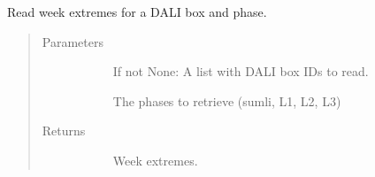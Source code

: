 \documentclass[letterpaper,10pt,english]{sphinxmanual}
\begin{document}
\begin{fulllineitems}
\label{\detokenize{autoapi/src/utils/snowflake/index:src.utils.snowflake.read_week_extremes}}
Read week extremes for a DALI box and phase.
\begin{quote}\begin{description}
\item[{Parameters}] \leavevmode\begin{description}
\item[{}] \leavevmode
If not None: A list with DALI box IDs to read.

\item[{}] \leavevmode
The phases to retrieve (sumli, L1, L2, L3)

\end{description}

\item[{Returns}] \leavevmode\begin{description}
\item[{}] \leavevmode
Week extremes.

\end{description}

\end{description}\end{quote}

\end{fulllineitems}


\begin{fulllineitems}
\label{\detokenize{autoapi/src/utils/snowflake/index:src.utils.snowflake.clear_forecasts}}
\end{fulllineitems}


\begin{fulllineitems}
\label{\detokenize{autoapi/src/utils/snowflake/index:src.utils.snowflake.clear_forecast_meta}}
\end{fulllineitems}
\end{document}
